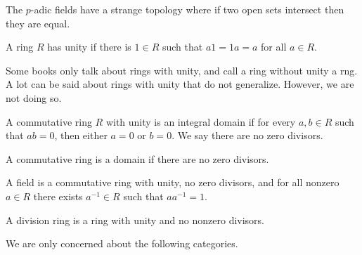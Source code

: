 \begin{remark}
	The $p$-adic fields have a strange topology where if two open sets intersect then they are equal.
\end{remark}

\begin{definition}[Unity]\label{dfn:UN}
	A ring $R$ has unity if there is $1\in R$ such that $a1=1a=a$ for all $a\in R$.
\end{definition}
\begin{note}
Some books only talk about rings with unity, and call a ring without unity a rng. A lot can be said about rings with unity that do not generalize. However, we are not doing so.
\end{note}
\begin{definition}\label{dfn:ID}
	A commutative ring $R$ with unity is an integral domain if for every $a,b\in R$ such that $ab=0$, then either $a=0$ or $b=0$. We say there are no zero divisors.
\end{definition}
\begin{definition}[Domain]\label{dfn:D}
	A commutative ring is a domain if there are no zero divisors.
\end{definition}
\begin{definition}[Field]\label{dfn:Field}
	A field is a commutative ring with unity, no zero divisors, and for all nonzero $a\in R$ there exists $a^{-1}\in R$ such that $aa^{-1}=1$.
\end{definition}
\begin{definition}\label{dfn:Div}
	A division ring is a ring with unity and no nonzero divisors.
\end{definition}
We are only concerned about the following categories.
\begin{center}
\end{center}

